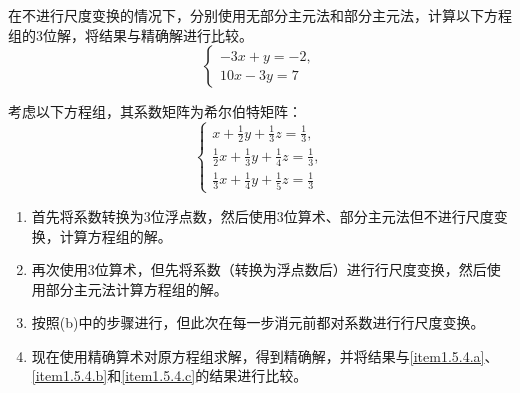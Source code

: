 \begin{exercise}
在不进行尺度变换的情况下，分别使用无部分主元法和部分主元法，计算以下方程组的3位解，将结果与精确解进行比较。
$$
\begin{cases} 
-3x + y = -2, \\
10x - 3y = 7
\end{cases}
$$
\end{exercise}

\begin{exercise}
考虑以下方程组，其系数矩阵为希尔伯特矩阵：
$$
\begin{cases} 
x + \frac{1}{2}y + \frac{1}{3}z = \frac{1}{3}, \\
\frac{1}{2}x + \frac{1}{3}y + \frac{1}{4}z = \frac{1}{3}, \\
\frac{1}{3}x + \frac{1}{4}y + \frac{1}{5}z = \frac{1}{3}
\end{cases}
$$
\begin{enumerate}[label=(\alph*)]
    \item 首先将系数转换为3位浮点数，然后使用3位算术、部分主元法但不进行尺度变换，计算方程组的解。\label{item1.5.4.a}
    \item 再次使用3位算术，但先将系数（转换为浮点数后）进行行尺度变换，然后使用部分主元法计算方程组的解。\label{item1.5.4.b}
    \item 按照(b)中的步骤进行，但此次在每一步消元前都对系数进行行尺度变换。\label{item1.5.4.c}
    \item 现在使用精确算术对原方程组求解，得到精确解，并将结果与\ref{item1.5.4.a}、\ref{item1.5.4.b}和\ref{item1.5.4.c}的结果进行比较。
\end{enumerate}
\end{exercise}
